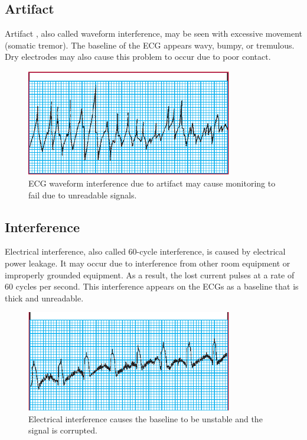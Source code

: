 \subsection{Artifact}
Artifact , also called waveform interference, may be seen with excessive movement (somatic tremor). The baseline of the ECG appears wavy, bumpy, or tremulous. Dry electrodes may also cause this problem to occur due to poor contact.
\begin{figure}[ht!]
	\centering
	\includegraphics[width=90mm]{figures/ch2/9.png}
	\caption{ECG waveform interference due to artifact may cause monitoring to fail due to unreadable signals.}
	\label{fig2.9}
\end{figure}

\subsection{Interference}
Electrical interference, also called 60-cycle interference, is caused by electrical power leakage. It may occur due to interference from other room equipment or improperly grounded equipment. As a result, the lost current pulses at a rate of 60 cycles per second. This interference appears on the ECGs as a baseline that is thick and unreadable.
\begin{figure}[ht!]
	\centering
	\includegraphics[width=90mm]{figures/ch2/10.png}
	\caption{Electrical interference causes the baseline to be unstable and the signal is corrupted.}
	\label{fig2.10}
\end{figure}

